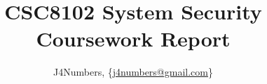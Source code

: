\documentclass[10pt,journal,compsoc]{IEEEtran}
\begin{document}
%
\title{CSC8102 System Security Coursework Report}
%
%
%
%

\author{J4Numbers, \{\url{j4numbers@gmail.com}\}}%

% 
%
\end{document}
